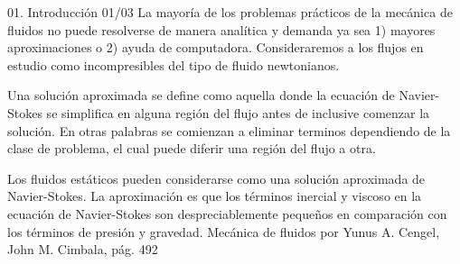 \begin{frame}{01. Introducción 01/03}
\justifying
La mayoría de los problemas prácticos de la mecánica de fluidos no puede resolverse de manera analítica y demanda ya sea 1) mayores aproximaciones o 2) ayuda de computadora. Consideraremos a los flujos en estudio como incompresibles del tipo de fluido newtonianos.


Una solución aproximada se define como aquella donde la ecuación de Navier-Stokes se simplifica en alguna región del flujo antes de inclusive comenzar la solución. En otras palabras se comienzan a eliminar terminos dependiendo de la clase de problema, el cual puede diferir una región del flujo a otra.


Los fluidos estáticos pueden considerarse como una solución aproximada de Navier-Stokes. La aproximación es que los términos inercial y viscoso en la ecuación de Navier-Stokes son despreciablemente pequeños en comparación con los términos de presión y gravedad.
{\tiny Mecánica de fluidos por Yunus A. Cengel, John M. Cimbala, pág. 492}
\end{frame}

